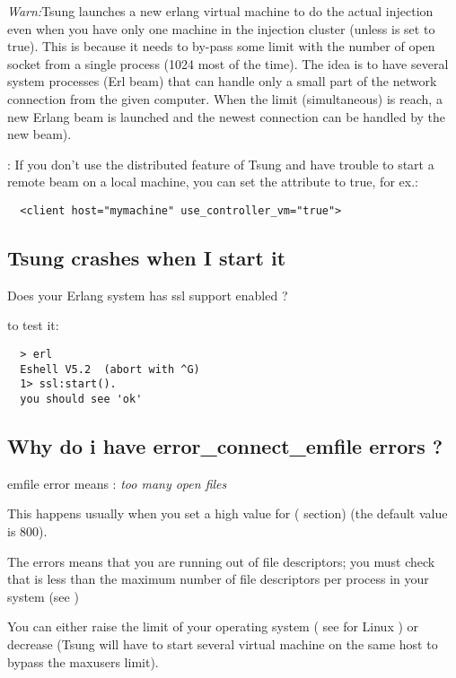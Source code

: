 \documentclass{TSUNG-en}
\begin{document}
\begin{appendix}
\emph{Warn:}Tsung launches a new erlang virtual machine to do the actual injection
even when you have only one machine in the injection cluster (unless
 is set to true). This is because it
needs to by-pass some limit with the number of open socket from a
single process (1024 most of the time). The idea is to have several
system processes (Erl beam) that can handle only a small part of the
network connection from the given computer. When the
 limit (simultaneous) is reach, a new Erlang beam
is launched and the newest connection can be handled by the new beam).

: If you don't use the distributed feature of
Tsung and have trouble to start a remote beam on a local machine,
you can set the  attribute to true, for ex.:

\begin{Verbatim}
  <client host="mymachine" use_controller_vm="true">
\end{Verbatim}


\subsection{Tsung crashes when I start it }

Does your Erlang system has ssl support enabled ?

to test it:
\begin{Verbatim}
  > erl
  Eshell V5.2  (abort with ^G)
  1> ssl:start().
  you should see 'ok'
\end{Verbatim}

\subsection{Why do i have error\_connect\_emfile errors ?}
\label{sec:faq:emfile}
emfile error means : \emph{too many open files}

This happens usually when you set a high value for 
( section) (the default value is 800).


The errors means that you are running out of file descriptors; you
must check that  is less than the maximum number of
file descriptors per process in your system (see )

You can either raise the limit of your operating system ( see
 for Linux ) or decrease 
(Tsung will have to start several virtual machine on the same host to
bypass the maxusers limit).


\end{appendix}
\end{document}
